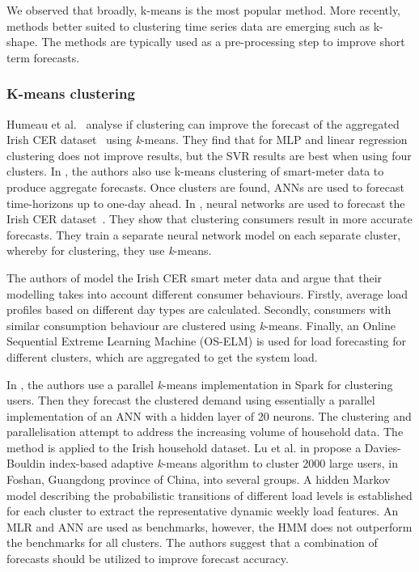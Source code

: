 We observed that broadly,  k-means is the most popular method. More recently, methods better suited to clustering time series data are emerging such as k-shape. The methods are typically used as a pre-processing step to improve short term forecasts. 

\subsubsection{K-means clustering}
Humeau et al.~\cite{Humeau2013elf} analyse if clustering can improve the forecast of the aggregated Irish CER dataset~\cite{Commission2012csm} using \textit{k}-means. They find that for MLP and linear regression clustering does not improve results, but the SVR results are best when using four clusters. In \cite{quilumba2015usm}, the authors also use k-means clustering of smart-meter data to produce aggregate forecasts. Once clusters are found, ANNs are used to forecast time-horizons up to one-day ahead. In \cite{Shahzadeh2015ilf}, neural networks are used to forecast the Irish CER dataset~\cite{Commission2012csm}. They show that clustering consumers result in more accurate forecasts. They train a separate neural network model on each separate cluster, whereby for clustering, they use \textit{k}-means.

The authors of \cite{Li2016slf} model the Irish CER smart meter data and argue that their modelling takes into account different consumer behaviours. Firstly, average load profiles based on different day types are calculated. Secondly, consumers with similar consumption behaviour are clustered using \textit{k}-means. Finally, an Online Sequential Extreme Learning Machine (OS-ELM) is used for load forecasting for different clusters, which are aggregated to get the system load. 

In \cite{li2020sbp}, the authors use a parallel \textit{k}-means implementation in Spark for clustering users. Then they forecast the clustered demand using essentially a parallel implementation of an ANN with a hidden layer of 20 neurons. The clustering and parallelisation attempt to address the increasing volume of household data. The method is applied to the Irish household dataset. Lu et al. in  \cite{lu2019awl} propose a Davies-Bouldin index-based adaptive \textit{k}-means algorithm to cluster 2000 large users, in Foshan, Guangdong province of China, into several groups. A hidden Markov model describing the probabilistic transitions of different load levels is established for each cluster to extract the representative dynamic weekly load features. An MLR and ANN are used as benchmarks, however, the HMM does not outperform the benchmarks for all clusters. The authors suggest that a combination of forecasts should be utilized to improve forecast accuracy.

